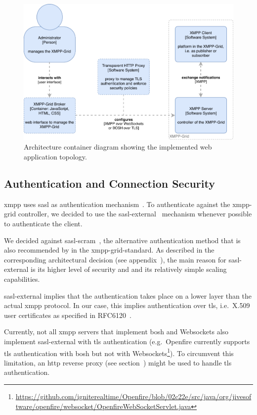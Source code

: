 \begin{figure}[H]
    \centering
    \includegraphics[width=\linewidth]{resources/architecture_container_webapplication_with_http_proxy}
    \caption[Architecture container diagram: Web application with proxy]{Architecture container diagram showing the implemented web application topology.}
    \label{fig:architecturecontainerweb-http-proxy}
\end{figure}
  

\subsection{Authentication and Connection Security}\label{sec:authentication-and-connection-security}

\gls{xmpp} uses \gls{sasl} as authentication mechanism~\cite{rfc6120}.
To authenticate against the \gls{xmpp-grid} \gls{controller}, we decided to use the \gls{sasl-external}~\cite{rfc4422} mechanism whenever possible to authenticate the client.

We decided against \gls{sasl-scram}~\cite{rfc7677}, the alternative authentication method that is also recommended by in the \gls{xmpp-grid-standard}.
As described in the corresponding architectural decision (see appendix~), the main reason for \gls{sasl-external} is its higher level of security and and its relatively simple scaling capabilities.

\gls{sasl-external} implies that the authentication takes place on a lower layer than the actual \gls{xmpp} protocol. In our case, this implies authentication over \gls{tls}, i.e.~X.509 user certificates as specified in RFC6120~\cite{rfc6120}.

Currently, not all \gls{xmpp} servers that implement \gls{bosh} and Websockets also implement \gls{sasl-external} with \gls{tls} authentication
(e.g.\ Openfire currently supports \gls{tls} authentication with \gls{bosh} but not with Websockets\footnote{\url{https://github.com/igniterealtime/Openfire/blob/02c22e/src/java/org/jivesoftware/openfire/websocket/OpenfireWebSocketServlet.java}}).
To circumvent this limitation, an \gls{http} reverse proxy (see section~) might be used to handle \gls{tls} authentication.

